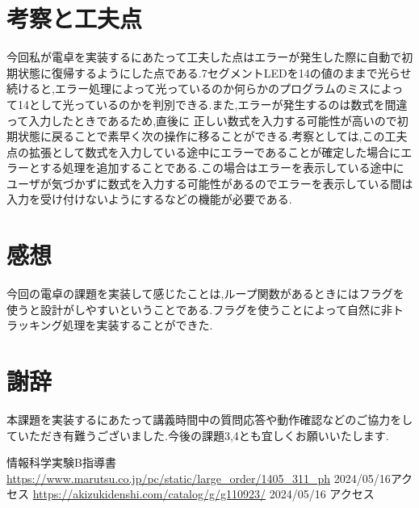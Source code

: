 \documentclass[dvipdfmx]{jarticle}
\begin{document}
\section{考察と工夫点}
今回私が電卓を実装するにあたって工夫した点はエラーが発生した際に自動で初期状態に復帰するようにした点である.7セグメントLEDを14の値のままで光らせ続けると,エラー処理によって光っているのか何らかのプログラムのミスによって14として光っているのかを判別できる.また,エラーが発生するのは数式を間違って入力したときであるため,直後に
正しい数式を入力する可能性が高いので初期状態に戻ることで素早く次の操作に移ることができる.考察としては,この工夫点の拡張として数式を入力している途中にエラーであることが確定した場合にエラーとする処理を追加することである.この場合はエラーを表示している途中にユーザが気づかずに数式を入力する可能性があるのでエラーを表示している間は入力を受け付けないようにするなどの機能が必要である.
\section{感想}
今回の電卓の課題を実装して感じたことは,ループ関数があるときにはフラグを使うと設計がしやすいということである.フラグを使うことによって自然に非トラッキング処理を実装することができた.
\section{謝辞}
本課題を実装するにあたって講義時間中の質問応答や動作確認などのご協力をしていただき有難うございました.今後の課題3,4とも宜しくお願いいたします.
\begin{thebibliography}{10}
     情報科学実験B指導書
     \url{https://www.marutsu.co.jp/pc/static/large_order/1405_311_ph} 2024/05/16アクセス
     \url{https://akizukidenshi.com/catalog/g/g110923/} 2024/05/16 アクセス
\end{thebibliography}
\end{document}
